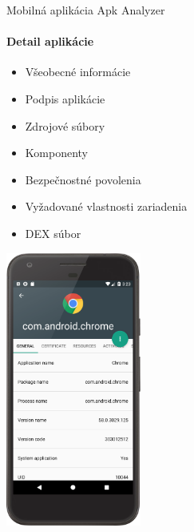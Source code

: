 \documentclass{beamer}
\begin{document}
  \begin{frame}[label=lists]{Mobilná aplikácia Apk Analyzer}
 	 \framesubtitle{Detail aplikácie}
	\begin{minipage}[htb]{\textwidth}
		\begin{minipage}[t]{0.5\textwidth}
			\hbox{}
			\hbox{}
			\hbox{}
			\begin{itemize}
				\item Všeobecné informácie
				\item Podpis aplikácie
				\item Zdrojové súbory
				\item Komponenty
				\item Bezpečnostné povolenia
				\item Vyžadované vlastnosti zariadenia
				\item DEX súbor
			\end{itemize}
     		\vfill
		\end{minipage}%
	\hfill
	\centering
		\begin{minipage}[t][][b]{0.4\textwidth}
		\centering
		\includegraphics[height=9cm]{images/app/detail_device.png}
		\label{fig:app-detail}
		\end{minipage}%
	\end{minipage}
  \end{frame}   
  
\end{document}
